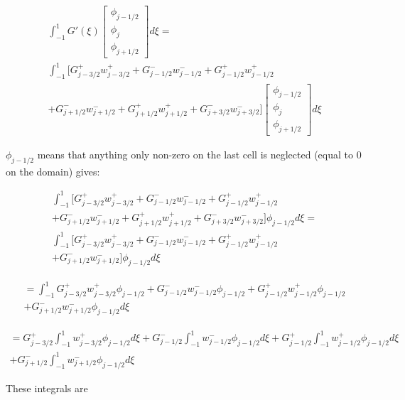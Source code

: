 \documentclass[12pt]{article}
\begin{document}
\begin{multline*}
\int_{-1}^{1}G'(\xi)\left[\begin{array}{c}\phi_{j-1/2} \\\phi_{j}\\\phi_{j+1/2} \end{array}\right] d\xi = \\
\int_{-1}^{1}\bigg[G^+_{j - 3/2}w^+_{j - 3/2} + G^-_{j - 1/2}w^-_{j - 1/2} + G^+_{j - 1/2}w^+_{j - 1/2} \\+ G^-_{j + 1/2}w^-_{j + 1/2} + G^+_{j + 1/2}w^+_{j + 1/2} + G^-_{j + 3/2}w^-_{j + 3/2} \bigg]\left[\begin{array}{c}\phi_{j-1/2} \\\phi_{j}\\\phi_{j+1/2} \end{array}\right] d\xi
\end{multline*}

$\phi_{j - 1/2}$ means that anything only non-zero on the last cell is neglected (equal to 0 on the domain) gives:

\begin{multline*}
\int_{-1}^{1}\bigg[G^+_{j - 3/2}w^+_{j - 3/2} + G^-_{j - 1/2}w^-_{j - 1/2} + G^+_{j - 1/2}w^+_{j - 1/2} \\+ G^-_{j + 1/2}w^-_{j + 1/2} + G^+_{j + 1/2}w^+_{j + 1/2} + G^-_{j + 3/2}w^-_{j + 3/2}\bigg] \phi_{j-1/2} d\xi =
\\
\int_{-1}^{1}\bigg[G^+_{j - 3/2}w^+_{j - 3/2} + G^-_{j - 1/2}w^-_{j - 1/2} + G^+_{j - 1/2}w^+_{j - 1/2} \\+ G^-_{j + 1/2}w^-_{j + 1/2}\bigg] \phi_{j-1/2} d\xi
\end{multline*}

\begin{multline*}
=
\int_{-1}^{1}G^+_{j - 3/2}w^+_{j - 3/2}\phi_{j-1/2} + G^-_{j - 1/2}w^-_{j - 1/2}\phi_{j-1/2} + G^+_{j - 1/2}w^+_{j - 1/2}\phi_{j-1/2} \\+ G^-_{j + 1/2}w^-_{j + 1/2} \phi_{j-1/2} d\xi
\end{multline*}

\begin{multline*}
=
G^+_{j - 3/2}\int_{-1}^{1}w^+_{j - 3/2}\phi_{j-1/2}  d\xi + G^-_{j - 1/2} \int_{-1}^{1}w^-_{j - 1/2}\phi_{j-1/2}  d\xi + G^+_{j - 1/2} \int_{-1}^{1}w^+_{j - 1/2}\phi_{j-1/2}  d\xi \\+ G^-_{j + 1/2} \int_{-1}^{1}w^-_{j + 1/2} \phi_{j-1/2} d\xi
\end{multline*}

These integrals are
\end{document}
